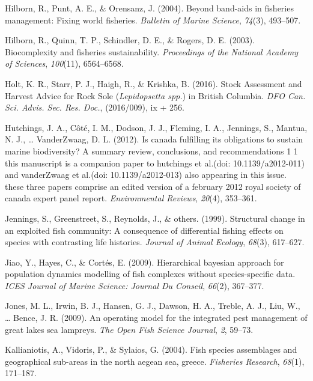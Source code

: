 \documentclass[12pt,]{scrartcl}
\begin{document}
\hypertarget{ref-hilborn2004beyond}{}
Hilborn, R., Punt, A. E., \& Orensanz, J. (2004). Beyond band-aids in
fisheries management: Fixing world fisheries. \emph{Bulletin of Marine
Science}, \emph{74}(3), 493--507.

\hypertarget{ref-hilborn2003biocomplexity}{}
Hilborn, R., Quinn, T. P., Schindler, D. E., \& Rogers, D. E. (2003).
Biocomplexity and fisheries sustainability. \emph{Proceedings of the
National Academy of Sciences}, \emph{100}(11), 6564--6568.

\hypertarget{ref-holt2016stock-asse}{}
Holt, K. R., Starr, P. J., Haigh, R., \& Krishka, B. (2016). Stock
Assessment and Harvest Advice for Rock Sole (\emph{Lepidopsetta spp.})
in British Columbia. \emph{DFO Can. Sci. Advis. Sec. Res. Doc.},
(2016/009), ix + 256.

\hypertarget{ref-hutchings2012canada}{}
Hutchings, J. A., Côté, I. M., Dodson, J. J., Fleming, I. A., Jennings,
S., Mantua, N. J., \ldots{} VanderZwaag, D. L. (2012). Is canada
fulfilling its obligations to sustain marine biodiversity? A summary
review, conclusions, and recommendations 1 1 this manuscript is a
companion paper to hutchings et al.(doi: 10.1139/a2012-011) and
vanderZwaag et al.(doi: 10.1139/a2012-013) also appearing in this issue.
these three papers comprise an edited version of a february 2012 royal
society of canada expert panel report. \emph{Environmental Reviews},
\emph{20}(4), 353--361.

\hypertarget{ref-jennings1999structural}{}
Jennings, S., Greenstreet, S., Reynolds, J., \& others. (1999).
Structural change in an exploited fish community: A consequence of
differential fishing effects on species with contrasting life histories.
\emph{Journal of Animal Ecology}, \emph{68}(3), 617--627.

\hypertarget{ref-jiao2009hierarchical}{}
Jiao, Y., Hayes, C., \& Cortés, E. (2009). Hierarchical bayesian
approach for population dynamics modelling of fish complexes without
species-specific data. \emph{ICES Journal of Marine Science: Journal Du
Conseil}, \emph{66}(2), 367--377.

\hypertarget{ref-jones2009operating}{}
Jones, M. L., Irwin, B. J., Hansen, G. J., Dawson, H. A., Treble, A. J.,
Liu, W., \ldots{} Bence, J. R. (2009). An operating model for the
integrated pest management of great lakes sea lampreys. \emph{The Open
Fish Science Journal}, \emph{2}, 59--73.

\hypertarget{ref-kallianiotis2004fish}{}
Kallianiotis, A., Vidoris, P., \& Sylaios, G. (2004). Fish species
assemblages and geographical sub-areas in the north aegean sea, greece.
\emph{Fisheries Research}, \emph{68}(1), 171--187.
\end{document}
